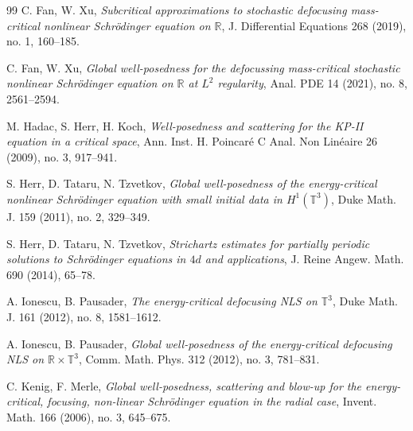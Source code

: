 \documentclass[letterpaper, 11pt,  reqno]{amsart}
\newcommand{\1}{\hspace{0.5mm}\text{I}\hspace{0.5mm}}
\newcommand{\R}{\mathbb{R}}
\newcommand{\T}{\mathbb{T}}
\numberwithin{equation}{section}
\numberwithin{theorem}{section}
\begin{document}
\begin{thebibliography}{99}
C. Fan, W. Xu,
{\it Subcritical approximations to stochastic defocusing mass-critical nonlinear Schr\"odinger equation on $\R$},
J. Differential Equations 268 (2019), no. 1, 160--185.



C. Fan, W. Xu,
{\it Global well-posedness for the defocussing mass-critical stochastic nonlinear Schr\"odinger equation on $\R$ at $L^2$ regularity},
Anal. PDE 14 (2021), no. 8, 2561--2594.










M. Hadac, S. Herr, H. Koch,
{\it Well-posedness and scattering for the KP-II equation in a critical space},
Ann. Inst. H. Poincar\'{e} C Anal. Non Lin\'{e}aire 26 (2009), no. 3, 917--941.



S. Herr, D. Tataru, N. Tzvetkov,
{\it  Global well-posedness of the energy-critical nonlinear Schr\"odinger equation with small initial data in $H^{1}(\T^{3})  $},
Duke Math. J. 159 (2011), no. 2, 329--349.



S. Herr, D. Tataru, N. Tzvetkov,
{\it  Strichartz estimates for partially periodic solutions to Schr\"odinger equations in $4d$ and applications},
J. Reine Angew. Math. 690 (2014), 65--78.



A. Ionescu, B. Pausader,
{\it   The energy-critical defocusing NLS on $\T^{3}   $},
Duke Math. J. 161 (2012), no. 8, 1581--1612.



A. Ionescu, B. Pausader,
{\it   Global well-posedness of the energy-critical defocusing NLS on $\R\times\T^3$},
Comm. Math. Phys. 312 (2012), no. 3, 781--831.


C. Kenig, F. Merle,
{\it Global well-posedness, scattering and blow-up for the energy-critical, focusing, non-linear Schr\"odinger equation in the radial case},
Invent. Math. 166 (2006), no. 3, 645--675.






\end{thebibliography}
\end{document}
